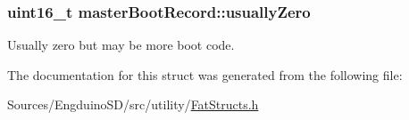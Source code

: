 \subsubsection[{usually\+Zero}]{\setlength{\rightskip}{0pt plus 5cm}uint16\+\_\+t master\+Boot\+Record\+::usually\+Zero}\label{structmaster_boot_record_afacfc863e98f64053cd9459c6dec948f}
Usually zero but may be more boot code. 

The documentation for this struct was generated from the following file\+:\begin{DoxyCompactItemize}
\item 
Sources/\+Engduino\+S\+D/src/utility/\hyperlink{_fat_structs_8h}{Fat\+Structs.\+h}\end{DoxyCompactItemize}
